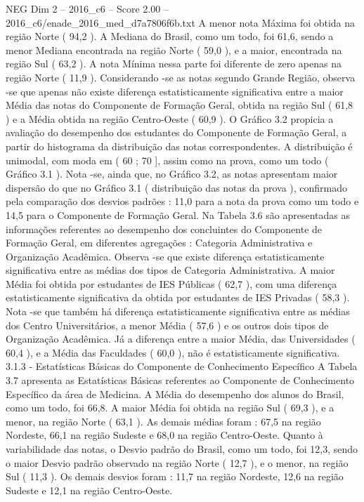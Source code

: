 \begin{textsample}{NEG Dim 2 – 2016\_c6 – Score 2.00 – 2016\_c6/enade\_2016\_med\_d7a7806f6b.txt}
A menor nota Máxima foi obtida na região Norte ( 94,2 ).
A Mediana do Brasil, como um todo, foi 61,6, sendo a menor Mediana encontrada na região Norte ( 59,0 ), e a maior, encontrada na região Sul ( 63,2 ).
A nota Mínima nessa parte foi diferente de zero apenas na região Norte ( 11,9 ).
Considerando -se as notas segundo Grande Região, observa -se que apenas não existe diferença estatisticamente significativa entre a maior Média das notas do Componente de Formação Geral, obtida na região Sul ( 61,8 ) e a Média obtida na região Centro-Oeste ( 60,9 ).
O Gráfico 3.2 propicia a avaliação do desempenho dos estudantes do Componente de Formação Geral, a partir do histograma da distribuição das notas correspondentes.
A distribuição é unimodal, com moda em ( 60 ; 70 ], assim como na prova, como um todo ( Gráfico 3.1 ).
Nota -se, ainda que, no Gráfico 3.2, as notas apresentam maior dispersão do que no Gráfico 3.1 ( distribuição das notas da prova ), confirmado pela comparação dos desvios padrões : 11,0 para a nota da prova como um todo e 14,5 para o Componente de Formação Geral.
Na Tabela 3.6 são apresentadas as informações referentes ao desempenho dos concluintes do Componente de Formação Geral, em diferentes agregações : Categoria Administrativa e Organização Acadêmica.
Observa -se que existe diferença estatisticamente significativa entre as médias dos tipos de Categoria Administrativa.
A maior Média foi obtida por estudantes de IES Públicas ( 62,7 ), com uma diferença estatisticamente significativa da obtida por estudantes de IES Privadas ( 58,3 ).
Nota -se que também há diferença estatisticamente significativa entre as médias dos Centro Universitários, a menor Média ( 57,6 ) e os outros dois tipos de Organização Acadêmica.
Já a diferença entre a maior Média, das Universidades ( 60,4 ), e a Média das Faculdades ( 60,0 ), não é estatisticamente significativa. 3.1.3 - Estatísticas Básicas do Componente de Conhecimento Específico A Tabela 3.7 apresenta as Estatísticas Básicas referentes ao Componente de Conhecimento Específico da área de Medicina.
A Média do desempenho dos alunos do Brasil, como um todo, foi 66,8.
A maior Média foi obtida na região Sul ( 69,3 ), e a menor, na região Norte ( 63,1 ).
As demais médias foram : 67,5 na região Nordeste, 66,1 na região Sudeste e 68,0 na região Centro-Oeste.
Quanto à variabilidade das notas, o Desvio padrão do Brasil, como um todo, foi 12,3, sendo o maior Desvio padrão observado na região Norte ( 12,7 ), e o menor, na região Sul ( 11,3 ).
Os demais desvios foram : 11,7 na região Nordeste, 12,6 na região Sudeste e 12,1 na região Centro-Oeste.

\end{textsample}
